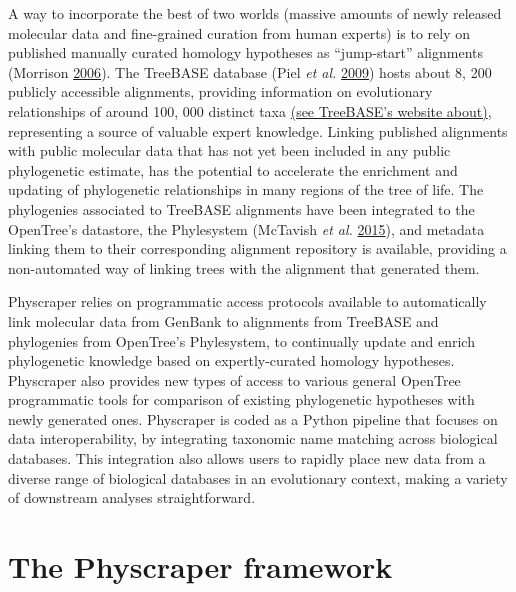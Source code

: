 \documentclass[]{article}
\begin{document}
A way to incorporate the best of two worlds (massive amounts of newly released molecular data and fine-grained curation from human experts) is to rely on published manually curated homology hypotheses as ``jump-start'' alignments (Morrison \protect\hyperlink{ref-morrison2006multiple}{2006}). The TreeBASE database (Piel \emph{et al.} \protect\hyperlink{ref-piel2009treebase}{2009}) hosts about 8, 200 publicly accessible alignments, providing information on evolutionary relationships of around 100, 000 distinct taxa \href{https://www.treebase.org/treebase-web/home.html\#:~:text=TreeBASE\%20is\%20produced\%20and\%20governed,mapped\%20to\%20104\%2C593\%20distinct\%20taxa.}{(see TreeBASE's website about)}, representing a source of valuable expert knowledge. Linking published alignments with public molecular data that has not yet been included in any public phylogenetic estimate, has the potential to accelerate the enrichment and updating of phylogenetic relationships in many regions of the tree of life. The phylogenies associated to TreeBASE alignments have been integrated to the OpenTree's datastore, the Phylesystem (McTavish \emph{et al.} \protect\hyperlink{ref-mctavish2015phylesystem}{2015}), and metadata linking them to their corresponding alignment repository is available, providing a non-automated way of linking trees with the alignment that generated them.

Physcraper relies on programmatic access protocols available to automatically link molecular data from GenBank to alignments from TreeBASE and phylogenies from OpenTree's Phylesystem, to continually update and enrich phylogenetic knowledge based on expertly-curated homology hypotheses. Physcraper also provides new types of access to various general OpenTree programmatic tools for comparison of existing phylogenetic hypotheses with newly generated ones.
Physcraper is coded as a Python pipeline that focuses on data interoperability, by integrating taxonomic name matching across biological databases. This integration also allows users to rapidly place new data from a diverse range of biological databases in an evolutionary context, making a variety of downstream analyses straightforward.

\hypertarget{the-physcraper-framework}{%
\section{The Physcraper framework}\label{the-physcraper-framework}}
\end{document}
